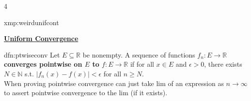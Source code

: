 \documentclass[landscape, 8pt]{extarticle}
\begin{document}
\begin{multicols*}{4}
\begin{xmp-s}{xmp:weirdunifcont}{ }
		\end{xmp-s}
		
		
		
		{\tiny \textbf{\underline{Uniform Convergence}}}	
		
		
		
		\begin{dfn}{dfn:ptwiseconv}{ }
		Let $E \subseteq \mathbb{R}$ be nonempty. A sequence of functions $f_n: E \to \mathbb{R}$ \textbf{converges pointwise on $E$ to $f: E \to \mathbb{R}$} if for all $x\in E$ and $ \epsilon > 0$, there exists $N\in \mathbb{N}$ s.t. $\left|f_n(x) - f(x)\right| <\epsilon$ for all $n \ge N$.\\
		When proving pointwise convergence can just take lim of an expression as $n \to \infty$ to assert pointwise convergence to the lim (if it exists). 
		
		\end{dfn}
		

\end{multicols*}
\end{document}
